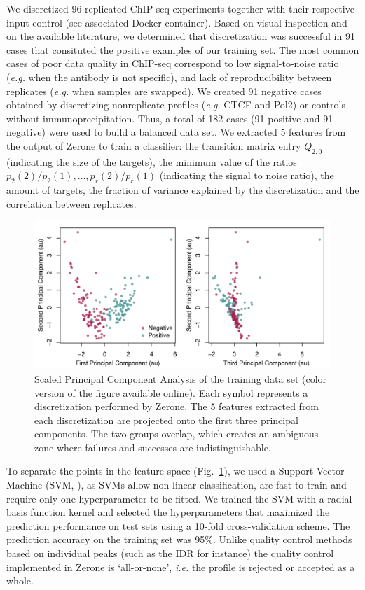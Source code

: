 \documentclass{bioinfo}
\begin{document}
\begin{methods}
We discretized 96 replicated ChIP-seq experiments together with their
respective input control (see associated Docker container). Based on
visual inspection and on the available literature, we determined
that discretization was successful in 91 cases that consituted the
positive examples of our training set. The most common cases of
poor data quality in ChIP-seq correspond to low signal-to-noise ratio
(\textit{e.g.} when the antibody is not specific), and lack of
reproducibility between replicates (\textit{e.g.} when samples are
swapped). We created 91 negative cases obtained by discretizing
nonreplicate profiles (\textit{e.g.} CTCF and Pol2) or controls without
immunoprecipitation. Thus, a total of 182 cases (91 positive and 91
negative) were used to build a balanced data set. We extracted 5
features from the output of Zerone to train a classifier:
the transition matrix entry $Q_{2,0}$ (indicating the size of the
targets), the minimum value of the ratios
$p_2(2)/p_2(1), \ldots, p_r(2)/p_r(1)$ (indicating the
signal to noise ratio), the amount of targets, the fraction of
variance explained by the discretization and the correlation between
replicates.


\begin{figure}[!tpb]
\centerline{\includegraphics[scale=0.45]{PCA.pdf}}
\caption{
  Scaled Principal Component Analysis of the training data set
  (color version of the figure available online).
  Each symbol represents a discretization performed by Zerone. The
  5 features extracted from each discretization are projected onto
  the first three principal components. The two groups overlap,
  which creates an ambiguous zone where failures and successes are
  indistinguishable.
}\label{fig:pca}
\end{figure}


To separate the points in the feature space (Fig.~\ref{fig:pca}),
we used a Support Vector Machine (SVM, \citealp{Chang2011,e1071}),
as SVMs allow non linear classification, are fast to train and 
require only one hyperparameter to be fitted.
We trained the SVM with a radial basis function kernel and
selected the hyperparameters that maximized the prediction
performance on test sets using a 10-fold cross-validation scheme.
The prediction accuracy on the training set was 95\%. Unlike
quality control methods based on individual peaks (such as the
IDR for instance) the quality control implemented in Zerone is
`all-or-none', \textit{i.e.} the profile is rejected or accepted
as a whole.


\end{methods}
\end{document}
